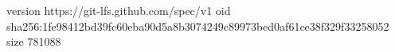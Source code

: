version https://git-lfs.github.com/spec/v1
oid sha256:1fe98412bd39fc60eba90d5a8b3074249c89973bed0af61ce38f329f33258052
size 781088

